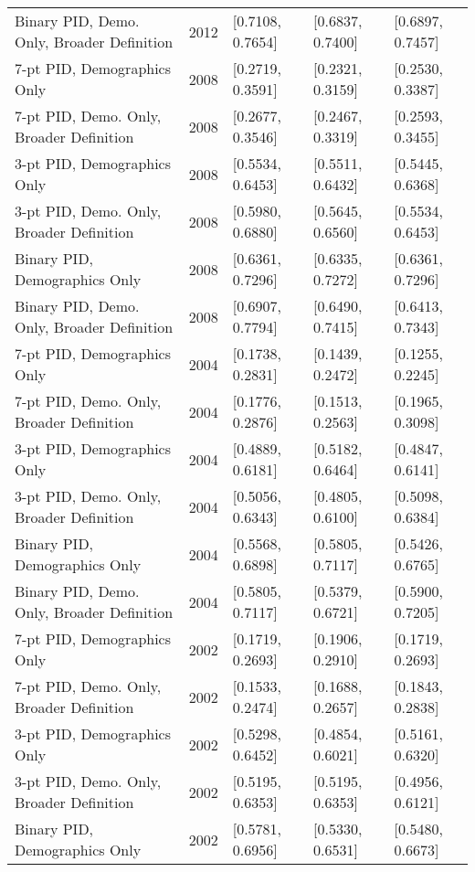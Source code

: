 \begin{longtable}{lrlll}
  Binary PID, Demo. Only, Broader Definition & 2012 & [0.7108, 0.7654] & [0.6837, 0.7400] & [0.6897, 0.7457] \\ 
  7-pt PID, Demographics Only & 2008 & [0.2719, 0.3591] & [0.2321, 0.3159] & [0.2530, 0.3387] \\ 
  7-pt PID, Demo. Only, Broader Definition & 2008 & [0.2677, 0.3546] & [0.2467, 0.3319] & [0.2593, 0.3455] \\ 
  3-pt PID, Demographics Only & 2008 & [0.5534, 0.6453] & [0.5511, 0.6432] & [0.5445, 0.6368] \\ 
  3-pt PID, Demo. Only, Broader Definition & 2008 & [0.5980, 0.6880] & [0.5645, 0.6560] & [0.5534, 0.6453] \\ 
  Binary PID, Demographics Only & 2008 & [0.6361, 0.7296] & [0.6335, 0.7272] & [0.6361, 0.7296] \\ 
  Binary PID, Demo. Only, Broader Definition & 2008 & [0.6907, 0.7794] & [0.6490, 0.7415] & [0.6413, 0.7343] \\ 
  7-pt PID, Demographics Only & 2004 & [0.1738, 0.2831] & [0.1439, 0.2472] & [0.1255, 0.2245] \\ 
  7-pt PID, Demo. Only, Broader Definition & 2004 & [0.1776, 0.2876] & [0.1513, 0.2563] & [0.1965, 0.3098] \\ 
  3-pt PID, Demographics Only & 2004 & [0.4889, 0.6181] & [0.5182, 0.6464] & [0.4847, 0.6141] \\ 
  3-pt PID, Demo. Only, Broader Definition & 2004 & [0.5056, 0.6343] & [0.4805, 0.6100] & [0.5098, 0.6384] \\ 
  Binary PID, Demographics Only & 2004 & [0.5568, 0.6898] & [0.5805, 0.7117] & [0.5426, 0.6765] \\ 
  Binary PID, Demo. Only, Broader Definition & 2004 & [0.5805, 0.7117] & [0.5379, 0.6721] & [0.5900, 0.7205] \\ 
  7-pt PID, Demographics Only & 2002 & [0.1719, 0.2693] & [0.1906, 0.2910] & [0.1719, 0.2693] \\ 
  7-pt PID, Demo. Only, Broader Definition & 2002 & [0.1533, 0.2474] & [0.1688, 0.2657] & [0.1843, 0.2838] \\ 
  3-pt PID, Demographics Only & 2002 & [0.5298, 0.6452] & [0.4854, 0.6021] & [0.5161, 0.6320] \\ 
  3-pt PID, Demo. Only, Broader Definition & 2002 & [0.5195, 0.6353] & [0.5195, 0.6353] & [0.4956, 0.6121] \\ 
  Binary PID, Demographics Only & 2002 & [0.5781, 0.6956] & [0.5330, 0.6531] & [0.5480, 0.6673] \\ 

\end{longtable}
